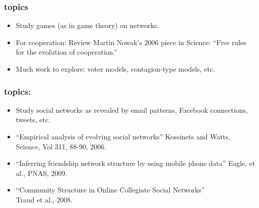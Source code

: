 \begin{frame}
  \frametitle{topics}

  \begin{itemize}
  \item<1->
    Study games (as in game theory) on
    networks.  
  \item<2->
    For cooperation: Review Martin Nowak's 2006 piece in Science:
    ``Five rules for the evolution of cooperation.''\cite{nowak2006a}
  \item<3-> Much work to explore: voter models, contagion-type models, etc.
  \end{itemize}

\end{frame}




\begin{frame}
  \frametitle{topics:}

  \begin{itemize}
  \item
    Study social networks as revealed
    by email patterns, Facebook connections, tweets, etc.
  \item
    ``Empirical analysis of evolving social networks''
    Kossinets and Watts, Science, Vol 311, 88-90, 2006.\cite{kossinets2006a}
  \item
    ``Inferring friendship network structure by using mobile phone data''
    Eagle, et al., PNAS, 2009.
  \item
    ``Community Structure in Online Collegiate Social Networks''\\
    Traud et al., 2008.\\
  \end{itemize}

\end{frame}


